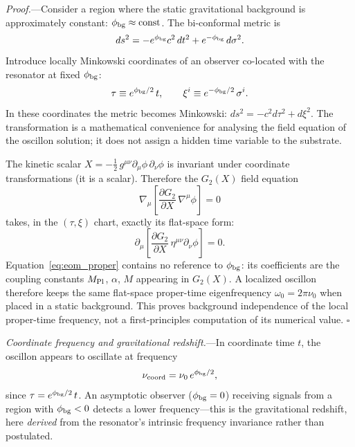 \documentclass[11pt]{article}
\begin{document}
\medskip
\textit{Proof.}---Consider a region where the static gravitational
background is approximately constant:
$\phi_{\rm bg} \approx \mathrm{const}$.  The bi-conformal metric
is
\begin{equation}
  ds^2 = -e^{\phi_{\rm bg}}c^2\,dt^2
  + e^{-\phi_{\rm bg}}\,d\sigma^2.
  \label{eq:metric_bg}
\end{equation}
Introduce locally Minkowski coordinates of an observer co-located
with the resonator at fixed $\phi_{\rm bg}$:
\begin{equation}
  \tau \equiv e^{\phi_{\rm bg}/2}\,t, \qquad
  \xi^i \equiv e^{-\phi_{\rm bg}/2}\,\sigma^i.
  \label{eq:proper_frame}
\end{equation}
In these coordinates the metric becomes Minkowski:
$ds^2 = -c^2 d\tau^2 + d\xi^2$.  The transformation is a
mathematical convenience for analysing the field equation of the
oscillon solution; it does not assign a hidden time variable to
the substrate.

The kinetic scalar
$X = -\tfrac{1}{2}\,g^{\mu\nu}\partial_\mu\phi\,
\partial_\nu\phi$
is invariant under coordinate transformations (it is a scalar).
Therefore the $G_2(X)$ field equation
\begin{equation}
  \nabla_\mu\!\left[
    \frac{\partial G_2}{\partial X}\,\nabla^\mu\phi
  \right] = 0
\end{equation}
takes, in the $(\tau,\xi)$ chart, exactly its flat-space form:
\begin{equation}
  \partial_\mu\!\left[
    \frac{\partial G_2}{\partial X}\,
    \eta^{\mu\nu}\partial_\nu\phi
  \right] = 0.
  \label{eq:eom_proper}
\end{equation}
Equation~\eqref{eq:eom_proper} contains no reference to
$\phi_{\rm bg}$: its coefficients are the coupling constants
$M_{\rm Pl}$, $\alpha$, $M$ appearing in $G_2(X)$.  A localized
oscillon therefore keeps the same flat-space proper-time
eigenfrequency $\omega_0 = 2\pi\nu_0$ when placed in a static
background.  This proves background independence of the local
proper-time frequency, not a first-principles computation of its
numerical value.  $\square$

\medskip
\textit{Coordinate frequency and gravitational redshift.}---In
coordinate time $t$, the oscillon appears to oscillate at frequency
\begin{equation}
  \nu_{\rm coord} = \nu_0\,e^{\phi_{\rm bg}/2},
  \label{eq:nu_coord}
\end{equation}
since $\tau = e^{\phi_{\rm bg}/2}\,t$.  An asymptotic observer
($\phi_{\rm bg} = 0$) receiving signals from a region with
$\phi_{\rm bg} < 0$ detects a lower frequency---this is the
gravitational redshift, here \emph{derived} from the resonator's
intrinsic frequency invariance rather than postulated.
\end{document}
